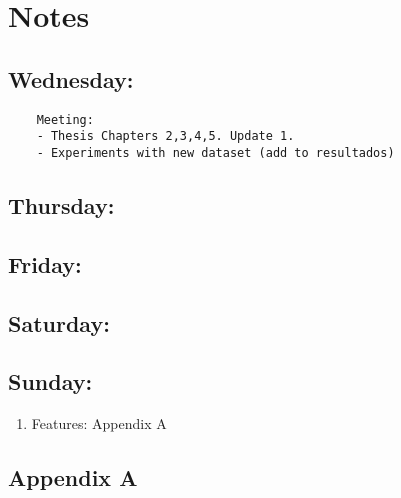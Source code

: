 \documentclass[12pt,oneside]{book}
\begin{document}
  \section*{Notes}
  \setlength\parindent{0pt}

  \subsection*{Wednesday:}

  \begin{lstlisting}
    Meeting:
    - Thesis Chapters 2,3,4,5. Update 1.
    - Experiments with new dataset (add to resultados)
  \end{lstlisting}

  \subsection*{Thursday:}

  \subsection*{Friday:}

  \subsection*{Saturday:}

  \subsection*{Sunday:}

  \begin{enumerate}
    \item Features: Appendix A
  \end{enumerate}

\subsection*{Appendix A}
\end{document}
